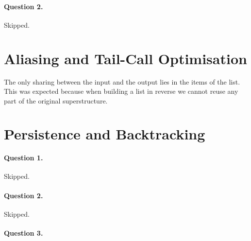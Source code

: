 \medskip

\paragraph{Question 2.} Skipped.

\section*{Aliasing and Tail\hyp{}Call Optimisation}
\label{ans:aliasing_and_tail-call_optimisation}


The only sharing between the input and the output lies in the items of
the list. This was expected because when building a list in reverse we
cannot reuse any part of the original superstructure.

\section*{Persistence and Backtracking}
\label{ans:persistence_and_backtracking}


\medskip

\paragraph{Question 1.} Skipped.

\medskip

\paragraph{Question 2.} Skipped.

\medskip

\paragraph{Question 3.}

